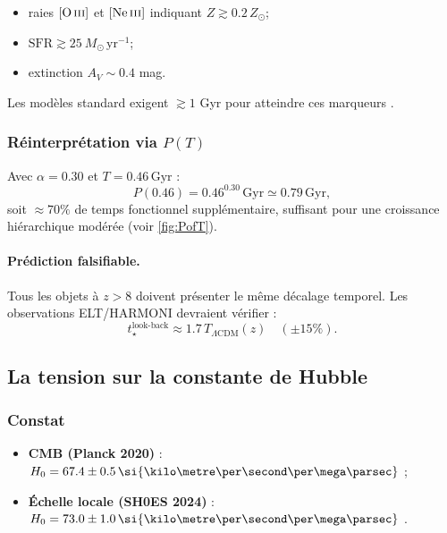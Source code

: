 \documentclass[11pt]{article}
\begin{document}
\begin{itemize}
  \item raies \([\mathrm{O\,\textsc{iii}}]\) et
        \([\mathrm{Ne\,\textsc{iii}}]\) indiquant
        \(Z\gtrsim0.2\,Z_\odot\);
  \item \(\mathrm{SFR}\gtrsim25~M_\odot\,\mathrm{yr^{-1}}\);
  \item extinction \(A_V\sim0.4\) mag.
\end{itemize}

Les modèles standard exigent \(\gtrsim1\) Gyr pour atteindre ces marqueurs
\parencite{Labbé2024,Naidu2024}.

\subsubsection*{Réinterprétation via \(P(T)\)}

Avec \(\alpha=0.30\) et \(T=0.46\,\mathrm{Gyr}\) :
\[
P(0.46)=0.46^{0.30}\,\mathrm{Gyr}\simeq0.79\,\mathrm{Gyr},
\]
soit \(\approx70\%\) de temps fonctionnel supplémentaire, suffisant pour
une croissance hiérarchique modérée (voir \autoref{fig:PofT}).

\paragraph{Prédiction falsifiable.}
Tous les objets à \(z>8\) doivent présenter le même décalage
temporel. Les observations ELT/HARMONI devraient vérifier :
\[
t_\star^{\text{look-back}}\approx1.7\,
T_{\Lambda\mathrm{CDM}}(z)\quad(\pm15\%).
\]

\subsection{La tension sur la constante de Hubble}

\subsubsection*{Constat}

\begin{itemize}
  \item \textbf{CMB (Planck 2020)} :
        \(H_0 = 67.4 \pm 0.5\,
        \si{\kilo\metre\per\second\per\mega\parsec}\)
        \parencite{Planck2020};
  \item \textbf{Échelle locale (SH0ES 2024)} :
        \(H_0 = 73.0 \pm 1.0\,
        \si{\kilo\metre\per\second\per\mega\parsec}\)
        \parencite{SH0ES2024}.
\end{itemize}
\end{document}
